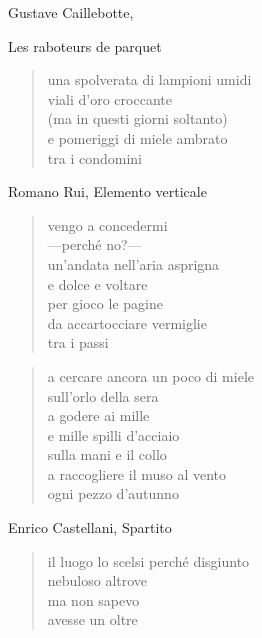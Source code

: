 \begin{artItem}
	Gustave Caillebotte, \begin{otherlanguage}{french}%
		Les raboteurs de parquet%
	\end{otherlanguage}
\end{artItem}

	\begin{verse}
		una spolverata di lampioni umidi\\
		viali d'oro croccante\\
		(ma in questi giorni soltanto)\\
		e pomeriggi di miele ambrato\\
		tra i condomini
	\end{verse}

\clearpage


\begin{artItem}
	Romano Rui, Elemento verticale
\end{artItem}

	\begin{verse}
		vengo a concedermi\\
		—perché no?—\\
		un'andata nell'aria asprigna\\
		e dolce e voltare\\
		per gioco le pagine\\
		da accartocciare vermiglie\\
		tra i passi
	\end{verse}

	\begin{verse}
		a cercare ancora un poco di miele\\
		sull'orlo della sera\\
		a godere ai mille\\
		e mille spilli d'acciaio\\
		sulla mani e il collo\\
		a raccogliere il muso al vento\\
		ogni pezzo d'autunno
	\end{verse}

\clearpage


\begin{artItem}
	Enrico Castellani, Spartito
\end{artItem}

	\begin{verse}
		il luogo lo scelsi perché disgiunto\\
		nebuloso altrove\\
		ma non sapevo\\
		avesse un oltre
	\end{verse}


